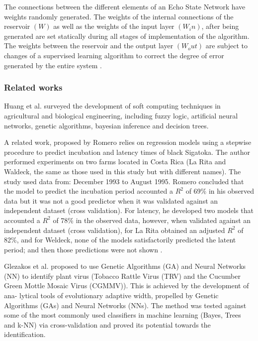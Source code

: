 \documentclass[review,authoryear,english]{elsarticle}
\begin{document}
The connections between the different elements of an Echo State Network have weights randomly generated. The weights of the internal connections of the reservoir $(W)$ as well as the weights of the input layer $(W_in)$, after being generated are set statically during all stages of implementation of the algorithm. The weights between the reservoir and the output layer $(W_out)$ are subject to changes of a supervised learning algorithm to correct the degree of error generated by the entire system \citep{Lukose2012}.

\subsubsection{Related works}
Huang et al. \citep{Huang2010}  surveyed the development of soft computing techniques in agricultural and biological engineering, including fuzzy logic, artificial neural networks, genetic algorithms, bayesian inference and decision trees.

A related work, proposed by Romero \citep{Romero1995} relies on regression models using a stepwise procedure to predict incubation and latency times of black Sigatoka. The author performed experiments on two farms located in Costa Rica (La Rita and Waldeck, the same as those used in this study but with different names). The study used data from: December 1993 to August 1995. Romero concluded that the model to predict the incubation period accounted a $R^2$ of 69\% in his observed data but it was not a good predictor when it was validated against an independent dataset (cross validation). For latency, he developed two models that accounted a $R^2$ of 78\% in the observed data, however, when validated against an independent dataset (cross validation), for La Rita obtained an adjusted $R^2$ of 82\%, and for Weldeck, none of the models satisfactorily predicted the latent period; and then those predictions were not shown \citep{Romero1995}.

Glezakos et al. \citep{Glezakos2010} proposed to use Genetic Algorithms (GA) and Neural Networks (NN) to identify plant virus (Tobacco Rattle Virus (TRV) and the Cucumber Green Mottle Mosaic Virus (CGMMV)). This is achieved by the development of ana- lytical tools of evolutionary adaptive width, propelled by Genetic Algorithms (GAs) and Neural Networks (NNs). The method was tested against some of the most commonly used classifiers in machine learning (Bayes, Trees and k-NN) via cross-validation and proved its potential towards the identification. 
\end{document}
